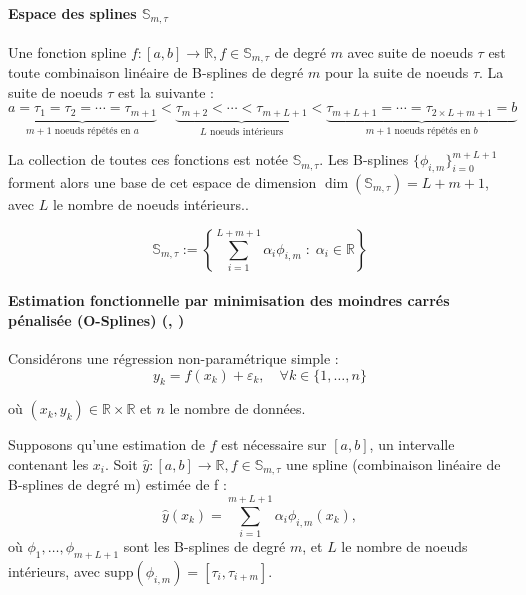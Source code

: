 \documentclass{article}
\begin{document}
	\paragraph{Espace des splines $\mathbb{S}_{m, \tau}$}
	Une fonction spline $f : [a, b] \rightarrow \mathbb{R}, f\in \mathbb{S}_{m, \tau}$ de degré $m$ avec suite de noeuds $\tau$ est toute combinaison linéaire de B-splines de degré $m$ pour la suite de noeuds $\tau$. 
	La suite de noeuds $\tau$ est la suivante : 
	\begin{equation}
		\underbrace{a = \tau_1 = \tau_2 = \cdots = \tau_{m+1}}_{m+1 \text{ noeuds répétés en } a} 
		< 
		\underbrace{\tau_{m+2} < \cdots < \tau_{m+L+1}}_{L \text{ noeuds intérieurs}} 
		< 
		\underbrace{\tau_{m+L+1} = \cdots = \tau_{2\times L+m+1}=b}_{m+1 \text{ noeuds répétés en } b}
	\end{equation}
	
	La collection de toutes ces fonctions est notée $\mathbb{S}_{m,\tau}$. Les B-splines $\{\phi_{i,m}\}_{i=0}^{m+L+1}$ forment alors une base de cet espace de dimension $\dim(\mathbb{S}_{m,\tau}) = L + m + 1$, avec $L$ le nombre de noeuds intérieurs.. 
	
	\begin{equation}
		\mathbb{S}_{m,\tau} := \left\{ \sum_{i=1}^{L+m+1} \alpha_i \phi_{i,m} \;:\; \alpha_i \in \mathbb{R}\right\}
	\end{equation}
	
	\paragraph{Estimation fonctionnelle par minimisation des moindres carrés 
		pénalisée (O-Splines) (\cite{wand2008}, \cite{eilers1996})}
	\label{par:moindres_carres}
	
	Considérons une régression non-paramétrique simple :
	\begin{equation}
		y_k = f(x_k) + \varepsilon_k, \quad \forall k \in \{1, \ldots, n\}
	\end{equation}
	
	où $(x_k, y_k) \in \mathbb{R} \times \mathbb{R}$ et $n$ le nombre de données.
	
	Supposons qu'une estimation de $f$ est nécessaire sur $[a, b]$, un intervalle 
	contenant les $x_i$. Soit $\hat y : [a, b] \rightarrow \mathbb{R}, f \in \mathbb{S}_{m, \tau}$ une spline (combinaison linéaire de B-splines de degré m) estimée de f :
	\begin{equation}
		\hat y(x_k) = \sum_{i=1}^{m+L+1} \alpha_i \phi_{i,m}(x_k),
	\end{equation}
	où $\phi_1, \ldots, \phi_{m+L+1}$ sont les B-splines de degré $m$, et $L$ le nombre de noeuds intérieurs, avec $\text{supp}(\phi_{i,m}) = [\tau_i, \tau_{i+m}]$.
	
\end{document}
